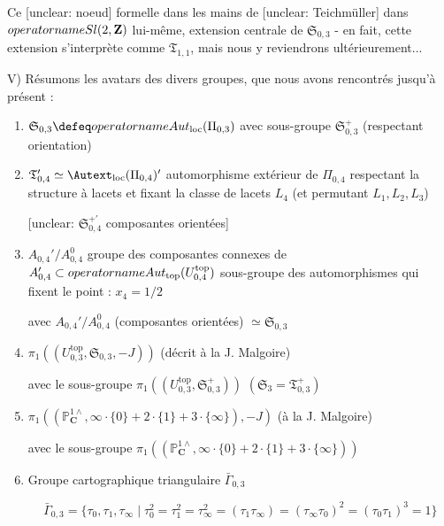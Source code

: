 Ce [unclear: noeud] formelle dans les mains de [unclear: Teichmüller] dans $\\operatorname{Sl}(2,\mathbf{Z})$ lui-même, extension centrale de $\mathfrak{S}_{0,3}$ - en fait, cette extension s'interprète comme $\mathfrak{T}_{1,1}$, mais nous y reviendrons ultérieurement...

V) Résumons les avatars des divers groupes, que nous avons rencontrés jusqu'à présent :

\begin{enumerate}
    \item[1)] $\mathfrak{S}_{0,3} \defeq \\operatorname{Aut}_{\mathrm{loc}}(\Pi_{0,3})$ \quad avec sous-groupe $\mathfrak{S}_{0,3}^+$ (respectant orientation)
    \item[2)] $\mathfrak{T}_{0,4}' \simeq \Autext_{\mathrm{loc}}(\Pi_{0,4})'$ \quad automorphisme extérieur de $\Pi_{0,4}$ respectant la structure à lacets et fixant la classe de lacets $L_4$ (et permutant $L_1, L_2, L_3$)
    
    [unclear: $\mathfrak{S}_{0,4}^{+'}$ composantes orientées]
    \item[3)] $A_{0,4}' / A_{0,4}^0$ groupe des composantes connexes de $A_{0,4}' \subset \\operatorname{Aut}_{\mathrm{top}}(U_{0,4}^{\mathrm{top}})$ sous-groupe des automorphismes qui fixent le point : $x_4=1/2$
    
    avec $A_{0,4}' / A_{0,4}^0$ (composantes orientées) $\simeq \mathfrak{S}_{0,3}$
    \item[4)] $\pi_1( (U_{0,3}^{\mathrm{top}}, \mathfrak{S}_{0,3}, -J) )$ (décrit à la J. Malgoire)
    
    avec le sous-groupe $\pi_1( (U_{0,3}^{\mathrm{top}}, \mathfrak{S}_{0,3}^+) )$ \quad $(\mathfrak{S}_3 = \mathfrak{T}_{0,3}^+)$
    \item[5)] $\pi_1( (\mathbb{P}_{\mathbf{C}}^{1 \wedge}, \infty \cdot \{0\} + 2 \cdot \{1\} + 3 \cdot \{\infty\} ), -J )$ (à la J. Malgoire)
    
    avec le sous-groupe $\pi_1( (\mathbb{P}_{\mathbf{C}}^{1 \wedge}, \infty \cdot \{0\} + 2 \cdot \{1\} + 3 \cdot \{\infty\} ) )$
    \item[6)] Groupe cartographique triangulaire $\bar{\Gamma}_{0,3}$
    
    $$ \bar{\Gamma}_{0,3} = \{ \tau_0, \tau_1, \tau_\infty \mid \tau_0^2 = \tau_1^2 = \tau_\infty^2 = (\tau_1\tau_\infty) = (\tau_\infty\tau_0)^2 = (\tau_0\tau_1)^3 = 1 \} $$
    

\end{enumerate}
